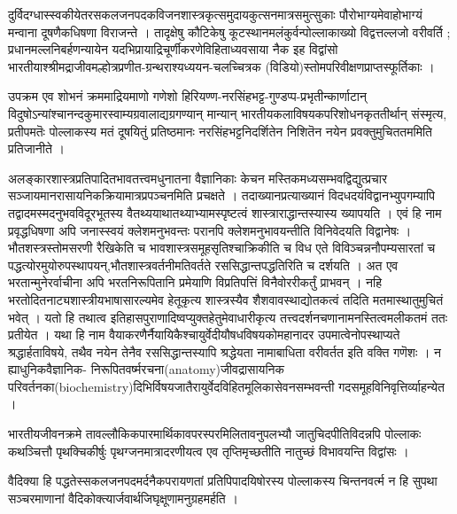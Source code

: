 {\dev दुर्विदग्धास्स्वकीयेतरसकलजनपदकविजनशास्त्रकृत्समुदायकुत्सनमात्रसमुत्सुकाः पौरोभाग्य\-मेवाहोभाग्यं मन्वाना दूषणैकधिषणा विराजन्ते । तादृक्षेषु कौटिकेषु कूटस्थानमलंकुर्वन्\break पोल्लाकाख्यो विद्वत्तल्लजो वरीवर्ति ; प्रधानमल्लनिबर्हणन्यायेन यदभिप्रायाद्रिचूर्णीकरणे\break विहिताध्यवसाया नैक इह विद्वांसो भारतीयाश्श्रीमद्राजीवमल्होत्रप्रणीत-ग्रन्थराश्यध्ययन-चलच्चित्रक (विडियो)स्तोमपरिवीक्षणप्राप्तस्फूर्तिकाः ।}

{\dev उपक्रम एव शोभनं क्रममाद्रियमाणो गणेशो हिरियण्ण-नरसिंहभट्ट-गुण्डप्प-प्रभृतीन्\break कार्णाटान् विदुषोऽन्यांश्चानन्दकुमारस्वाम्यग्रवालाद्यग्रगण्यान् मान्यान् भारतीयकला\-विषयक\-परिशोधनकृततीर्थान् संस्मृत्य, प्रतीपमतॆः पोल्लाकस्य मतं दूषयितुं प्रतिष्ठमानः नरसिंह\-भट्ट\-निदर्शितेन निशितॆन नयेन प्रवक्तुमुचिततममिति प्रतिजानीते ।}

{\dev अलङ्कारशास्त्रप्रतिपादितभावतत्त्वमधुनातना वैज्ञानिकाः केचन मस्तिकमध्यसम्भवद्विद्युत्प्रचार सञ्जायमानरासायनिकक्रियामात्रप्रपञ्चनमिति प्रचक्षते । तदाख्यानप्रत्याख्यानं विदधदयं\break विद्वानभ्युपगम्यापि तद्वादमस्मदनुभवविदूरभूतस्य वैतथ्ययाथातथ्याभ्यामस्पृष्टत्वं शास्त्राराद्धा\-न्तस्यास्य ख्यापयति । एवं हि नाम प्रवृद्धधिषणा अपि जनास्स्वयं क्लेशमनुभवन्तः परानपि क्लेशमनुभावयन्तीति विनिवेदयति विद्वानेषः । भौतशस्त्रस्तोमसरणी रैखिकेति च भावशास्त्र\-समूहसृतिश्चाक्रिकीति च विध एते विविञ्चन्ननौपम्यसारतां च पद्धत्योरमुयोरुपस्थापयन्,\break भौतशास्त्रवर्तनीमतिवर्तते रससिद्धान्तपद्धतिरिति च दर्शयति । अत एव भरतान्मुनेरर्वाचीना अपि भरतनिरूपितानि प्रमेयाणि विप्रतिपत्तिं विनैवोररीकर्तुं प्राभवन् । नहि भरतोदितनाट्य\-शास्त्रीयभाषासारल्यमेव हेतूकृत्य शास्त्रस्यैव शैशवावस्थाद्योतकत्वं तदिति मतमास्थातुमुचितं भवेत् । यतो हि तथात्व इतिहासपुराणादिष्वप्युक्तहेतुमेवाधारीकृत्य तत्त्वदर्शनचणानामनस्ति\-त्वमलीकतमं ततः प्रतीयेत । यथा हि नाम वैयाकरणैर्नैयायिकैश्चायुर्वेदीयौषधविषयको\break महानादर उपमात्वेनोपस्थाप्यते श्रद्धार्हताविषये, तथैव नयेन तेनैव रससिद्धान्तस्यापि श्रद्धेयता नामाबाधिता वरीवर्तत इति वक्ति गणॆशः । न ह्याधुनिकवैज्ञानिक- निरूपितवर्ष्मरचना}\break(anatomy){\dev जीवद्रासायनिक परिवर्तनका}(biochemistry){\dev दिभिर्विषयजातैरायुर्वेदविहित\-मूलिकासेवनसम्भवन्ती गदसमूहविनिवृत्तिर्व्याहन्येत ।}

{\dev भारतीयजीवनक्रमे तावल्लौकिकपारमार्थिकावपरस्परमिलितावनुपलभ्यौ जातुचिदपीति\break विदन्नपि पोल्लाकः कथञ्चित्तौ पृथक्चिकीर्षुः पृथग्जनमात्रादरणीयत्व एव तृप्तिमृच्छतीति नातुच्छं विभावयन्ति विद्वांसः ।}

{\dev वैदिक्या हि पद्धतेस्सकलजनपदमर्दनैकपरायणतां प्रतिपिपादयिषोरस्य पोल्लाकस्य चिन्तनवर्त्म न हि सुपथा सञ्चरमाणानां वैदिकोक्त्यार्जवार्थजिघृक्षूणामनुग्रहमर्हति ।}

